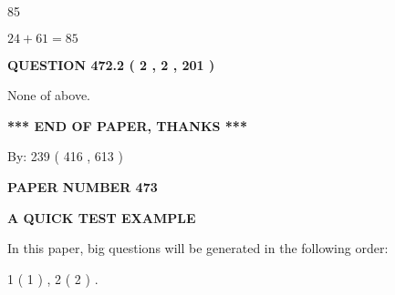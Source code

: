 \documentclass[12pt]{article}
\begin{document}
85
 
 
 
 
\noindent{}

$ %
24 +  %
61=   %
85$
 
 
  
\vspace{0.2in}
  
{\textbf{\Large{QUESTION
472.2 
 ( 2 , 2 , 201 )
}}}
  
  
 
 
\noindent{}
 
 
 None of above.
 
 
 
 
   
   
 \vspace{0.2in}
 
   
   
   
   
\vspace{1.0in} 
{\textbf{\large{ *** END OF PAPER, THANKS *** }}} 
   
   
\hspace{1.0in} By: 
 239 ( 416 ,  613 )
   
   
   
   
\newpage 
\setcounter{page}{ 
   473001 } 
   
   
   
   
 {\textbf{ \Large{ PAPER NUMBER  473  }}}
   
   
\vspace{0.2in}
   
   
   
   
   
   
 \vspace{0.2in}
{\LARGE {\textbf{ A QUICK TEST EXAMPLE}}}
   
   
   
\vspace{0.2in}
   
In this paper, big questions will be generated in the following order: 
   
   
   1 ( 1 )
 ,
   2 ( 2 )
 .
  
\vspace{0.2in}
  
\end{document}
